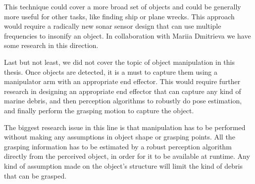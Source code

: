 This technique could cover a more broad set of objects and could be generally more useful for other tasks, like finding ship or plane wrecks. This approach would require a radically new sonar sensor design that can use multiple frequencies to insonify an object.  In collaboration with Mariia Dmitrieva we have some research\cite[-5em]{dmitrieva2017object} in this direction.

Last but not least, we did not cover the topic of object manipulation in this thesis. Once objects are detected, it is a must to capture them using a manipulator arm with an appropriate end effector. This would require further research in designing an appropriate end effector that can capture any kind of marine debris, and then perception algorithms to robustly do pose estimation, and finally perform the grasping motion to capture the object.

The biggest research issue in this line is that manipulation has to be performed without making any assumptions in object shape or grasping points. All the grasping information has to be estimated by a robust perception algorithm directly from the perceived object, in order for it to be available at runtime. Any kind of assumption made on the object's structure will limit the kind of debris that can be grasped.